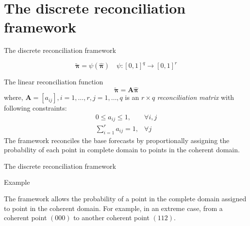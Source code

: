 \documentclass[12pt]{beamer}
\begin{document}
\section{The discrete reconciliation framework}

\begin{frame}{The discrete reconciliation framework}

    \begin{outline}
    \0 \[\tilde{\boldsymbol\pi} = \psi(\hat{\boldsymbol{\pi}})\quad \psi:[0,1]^{q} \rightarrow [0,1]^r\]
    
    \0 The linear reconciliation function
    \[
        \tilde{\boldsymbol\pi} = \boldsymbol{A}\hat{\boldsymbol{\pi}}
    \] where, $\boldsymbol{A}=[a_{ij}], i=1,\dots,r,j=1,\dots,q$ is an $r \times q$ \textit{reconciliation matrix} with following constraints:
    \[\begin{aligned}
        0 \leq a_{ij} \leq 1, &\forall i, j\\
        \sum_{i=1}^r a_{ij} = 1, &\forall j
    \end{aligned}\]
    The framework reconciles the base forecasts by proportionally assigning the probability of each point in complete domain to points in the coherent domain.
    \end{outline}
\end{frame}

\begin{frame}{The discrete reconciliation framework}

\begin{block}{Example}
\end{block}
\begin{outline}
    \1 The framework allows the probability of a point in the complete domain assigned to  point in the coherent domain. 
    \1 For example, in an extreme case, from a coherent point $(000)$ to another coherent point $(112)$.
\end{outline}
    
\end{frame}
\end{document}
